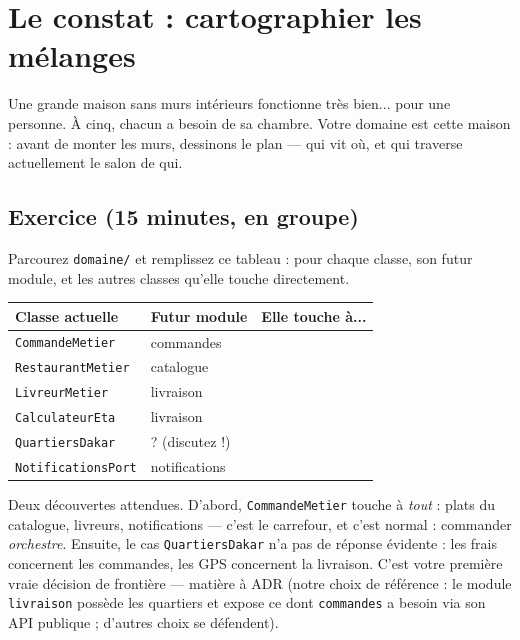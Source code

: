 \documentclass[a4paper,11pt]{article}
\begin{document}
\tableofcontents
\newpage

\section{Le constat : cartographier les mélanges}

\begin{intuition}
Une grande maison sans murs intérieurs fonctionne très bien... pour une
personne. À cinq, chacun a besoin de sa chambre. Votre domaine est cette
maison : avant de monter les murs, dessinons le plan --- qui vit où, et
qui traverse actuellement le salon de qui.
\end{intuition}

\subsection{Exercice (15 minutes, en groupe)}

Parcourez \texttt{domaine/} et remplissez ce tableau : pour chaque classe,
son futur module, et les autres classes qu'elle touche directement.

\begin{center}
\small
\begin{tabular}{p{}p{}p{}}
\toprule
\textbf{Classe actuelle} & \textbf{Futur module} & \textbf{Elle touche à...} \\
\midrule
\texttt{CommandeMetier} & commandes & \\
\texttt{RestaurantMetier} & catalogue & \\
\texttt{LivreurMetier} & livraison & \\
\texttt{CalculateurEta} & livraison & \\
\texttt{QuartiersDakar} & ? (discutez !) & \\
\texttt{NotificationsPort} & notifications & \\
\bottomrule
\end{tabular}
\end{center}

Deux découvertes attendues. D'abord, \texttt{CommandeMetier} touche à
\emph{tout} : plats du catalogue, livreurs, notifications --- c'est le
carrefour, et c'est normal : commander \emph{orchestre}. Ensuite, le cas
\texttt{QuartiersDakar} n'a pas de réponse évidente : les frais concernent
les commandes, les GPS concernent la livraison. C'est votre première vraie
décision de frontière --- matière à ADR (notre choix de référence : le
module \texttt{livraison} possède les quartiers et expose ce dont
\texttt{commandes} a besoin via son API publique ; d'autres choix se
défendent).
\end{document}
